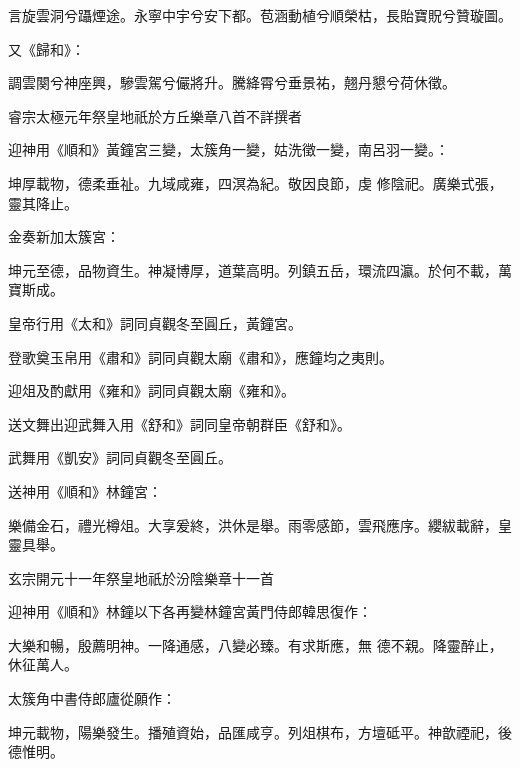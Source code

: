 \begin{pinyinscope}
 言旋雲洞兮躡煙途。永寧中宇兮安下都。苞涵動植兮順榮枯，長貽寶貺兮贊璇圖。



 又《歸和》：



 調雲闋兮神座興，驂雲駕兮儼將升。騰絳霄兮垂景祐，翹丹懇兮荷休徵。



 睿宗太極元年祭皇地祇於方丘樂章八首不詳撰者



 迎神用《順和》黃鐘宮三變，太簇角一變，姑洗徵一變，南呂羽一變。：



 坤厚載物，德柔垂祉。九域咸雍，四溟為紀。敬因良節，虔
 修陰祀。廣樂式張，靈其降止。



 金奏新加太簇宮：



 坤元至德，品物資生。神凝博厚，道葉高明。列鎮五岳，環流四瀛。於何不載，萬寶斯成。



 皇帝行用《太和》詞同貞觀冬至圓丘，黃鐘宮。



 登歌奠玉帛用《肅和》詞同貞觀太廟《肅和》，應鐘均之夷則。



 迎俎及酌獻用《雍和》詞同貞觀太廟《雍和》。



 送文舞出迎武舞入用《舒和》詞同皇帝朝群臣《舒和》。



 武舞用《凱安》詞同貞觀冬至圓丘。



 送神用《順和》林鐘宮：



 樂備金石，禮光樽俎。大享爰終，洪休是舉。雨零感節，雲飛應序。纓紱載辭，皇靈具舉。



 玄宗開元十一年祭皇地祇於汾陰樂章十一首



 迎神用《順和》林鐘以下各再變林鐘宮黃門侍郎韓思復作：



 大樂和暢，殷薦明神。一降通感，八變必臻。有求斯應，無
 德不親。降靈醉止，休征萬人。



 太簇角中書侍郎廬從願作：



 坤元載物，陽樂發生。播殖資始，品匯咸亨。列俎棋布，方壇砥平。神歆禋祀，後德惟明。




\end{pinyinscope}

